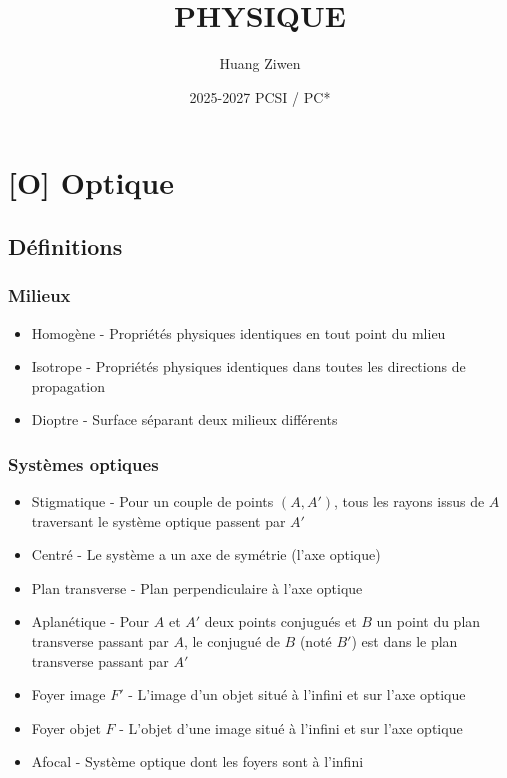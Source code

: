 \documentclass[openany]{book}
\title{PHYSIQUE}
\author{Huang Ziwen}
\date{2025-2027 PCSI / PC*}
\begin{document}
\pagestyle{plain}

\maketitle

\tableofcontents

\chapter{[O] Optique}
\section{Définitions}
\subsection{Milieux}
\begin{itemize}
    \item Homogène - Propriétés physiques identiques en tout point du mlieu
    \item Isotrope - Propriétés physiques identiques dans toutes les directions de propagation
    \item Dioptre - Surface séparant deux milieux différents
\end{itemize}

\subsection{Systèmes optiques}
\begin{itemize}
    \item Stigmatique - Pour un couple de points $ (A, A') $, tous les rayons issus de $A$ traversant le système optique passent par $A'$
    \item Centré - Le système a un axe de symétrie (l'axe optique)
    \item Plan transverse - Plan perpendiculaire à l'axe optique
    \item Aplanétique - Pour $A$ et $A'$ deux points conjugués et $B$ un point du plan transverse passant par $A$, le conjugué de $B$ (noté $B'$) est dans le plan transverse passant par $A'$
    \item Foyer image $F'$ - L'image d'un objet situé à l'infini et sur l'axe optique
    \item Foyer objet $F$ - L'objet d'une image situé à l'infini et sur l'axe optique
    \item Afocal - Système optique dont les foyers sont à l'infini
\end{itemize}
\end{document}
